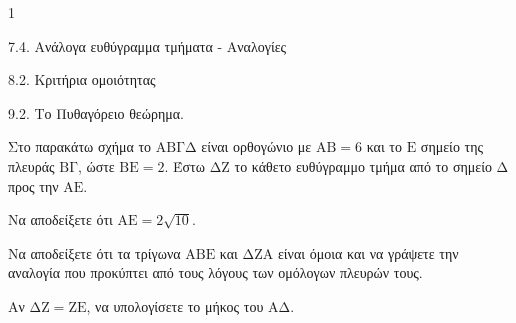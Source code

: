 \begin{ylh}{1}
    \item 7.4. Ανάλογα ευθύγραμμα τμήματα - Αναλογίες
    \item 8.2. Κριτήρια ομοιότητας
    \item 9.2. Το Πυθαγόρειο θεώρημα.
\end{ylh}
\begin{figure}
    \centering
\end{figure}

Στο παρακάτω σχήμα το $\mathrm{AB\Gamma\Delta}$ είναι ορθογώνιο με $\mathrm{AB} = 6$ και το $\mathrm{E}$ σημείο της πλευράς $\mathrm{B\Gamma}$, ώστε $\mathrm{BE} = 2$. Έστω $\mathrm{\Delta Z}$ το κάθετο ευθύγραμμο τμήμα από το σημείο $\mathrm{\Delta}$ προς την $\mathrm{AE}$.

\begin{alist}
    \item Να αποδείξετε ότι $\mathrm{AE} = 2\sqrt{10}$. 
    \item Να αποδείξετε ότι τα τρίγωνα $\mathrm{ABE}$ και $\mathrm{\Delta ZA}$ είναι όμοια και να γράψετε την αναλογία που προκύπτει από τους λόγους των ομόλογων πλευρών τους. 
    \item Αν $\mathrm{\Delta Z} = \mathrm{ZE}$, να υπολογίσετε το μήκος του $\mathrm{A\Delta}$. 
\end{alist}